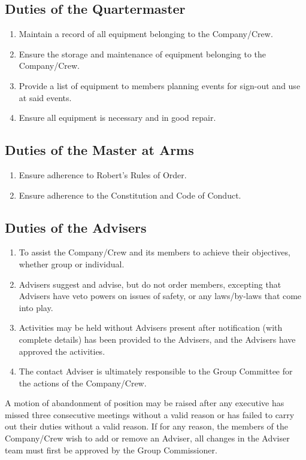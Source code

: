 \subsection{Duties of the Quartermaster}
\begin{enumerate}
    \item Maintain a record of all equipment belonging to the Company/Crew.
    \item Ensure the storage and maintenance of equipment belonging to the Company/Crew.
    \item Provide a list of equipment to members planning events for sign-out and use at said events.
    \item Ensure all equipment is necessary and in good repair.
\end{enumerate}

\subsection{Duties of the Master at Arms}
\begin{enumerate}
    \item Ensure adherence to Robert's Rules of Order.
    \item Ensure adherence to the Constitution and Code of Conduct.
\end{enumerate}

\subsection{Duties of the Advisers}
\begin{enumerate}
    \item To assist the Company/Crew and its members to achieve their objectives, whether group or individual.
    \item Advisers suggest and advise, but do not order members, excepting that Advisers have veto powers on issues of safety, or any laws/by-laws that come into play.
    \item Activities may be held without Advisers present after notification (with complete details) has been provided to the Advisers, and the Advisers have approved the activities.
    \item The contact Adviser is ultimately responsible to the Group Committee for the actions of the Company/Crew.
\end{enumerate}
A motion of abandonment of position may be raised after any executive has missed three consecutive meetings without a valid reason or has failed to carry out their duties without a valid reason.
If for any reason, the members of the Company/Crew wish to add or remove an Adviser, all changes in the Adviser team must first be approved by the Group Commissioner.